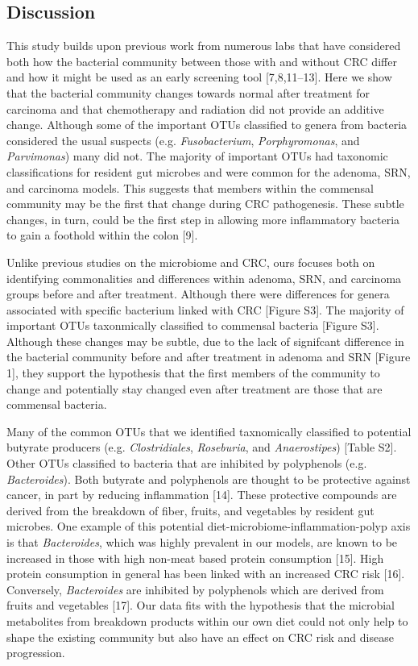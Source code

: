\documentclass[12pt,]{article}
\begin{document}
\newpage

\subsection{Discussion}\label{discussion}

This study builds upon previous work from numerous labs that have
considered both how the bacterial community between those with and
without CRC differ and how it might be used as an early screening tool
{[}7,8,11--13{]}. Here we show that the bacterial community changes
towards normal after treatment for carcinoma and that chemotherapy and
radiation did not provide an additive change. Although some of the
important OTUs classified to genera from bacteria considered the usual
suspects (e.g. \emph{Fusobacterium}, \emph{Porphyromonas}, and
\emph{Parvimonas}) many did not. The majority of important OTUs had
taxonomic classifications for resident gut microbes and were common for
the adenoma, SRN, and carcinoma models. This suggests that members
within the commensal community may be the first that change during CRC
pathogenesis. These subtle changes, in turn, could be the first step in
allowing more inflammatory bacteria to gain a foothold within the colon
{[}9{]}.

Unlike previous studies on the microbiome and CRC, ours focuses both on
identifying commonalities and differences within adenoma, SRN, and
carcinoma groups before and after treatment. Although there were
differences for genera associated with specific bacterium linked with
CRC {[}Figure S3{]}. The majority of important OTUs taxonmically
classified to commensal bacteria {[}Figure S3{]}. Although these changes
may be subtle, due to the lack of signifcant difference in the bacterial
community before and after treatment in adenoma and SRN {[}Figure 1{]},
they support the hypothesis that the first members of the community to
change and potentially stay changed even after treatment are those that
are commensal bacteria.

Many of the common OTUs that we identified taxnomically classified to
potential butyrate producers (e.g. \emph{Clostridiales},
\emph{Roseburia}, and \emph{Anaerostipes}) {[}Table S2{]}. Other OTUs
classified to bacteria that are inhibited by polyphenols (e.g.
\emph{Bacteroides}). Both butyrate and polyphenols are thought to be
protective against cancer, in part by reducing inflammation {[}14{]}.
These protective compounds are derived from the breakdown of fiber,
fruits, and vegetables by resident gut microbes. One example of this
potential diet-microbiome-inflammation-polyp axis is that
\emph{Bacteroides}, which was highly prevalent in our models, are known
to be increased in those with high non-meat based protein consumption
{[}15{]}. High protein consumption in general has been linked with an
increased CRC risk {[}16{]}. Conversely, \emph{Bacteroides} are
inhibited by polyphenols which are derived from fruits and vegetables
{[}17{]}. Our data fits with the hypothesis that the microbial
metabolites from breakdown products within our own diet could not only
help to shape the existing community but also have an effect on CRC risk
and disease progression.
\end{document}
